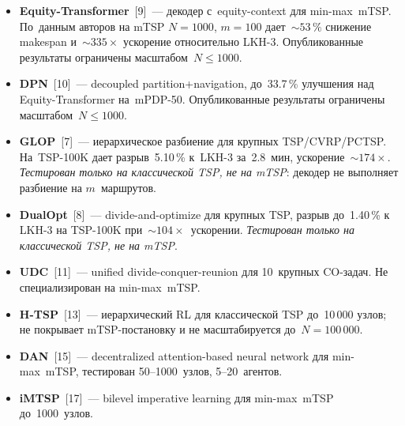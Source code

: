 \documentclass[a4paper,14pt]{extreport}
\begin{document}
\begin{itemize}
\item \textbf{Equity-Transformer}~[9]~--- декодер с~equity-context для min-max~mTSP. По~данным авторов на mTSP $N=1000$, $m=100$ дает~$\sim 53\,\%$ снижение makespan и~$\sim 335\times$ ускорение относительно LKH-3. Опубликованные результаты ограничены масштабом~$N \leq 1000$.
\item \textbf{DPN}~[10]~--- decoupled partition+navigation, до~33.7\,\% улучшения над Equity-Transformer на~mPDP-50. Опубликованные результаты ограничены масштабом~$N \leq 1000$.
\item \textbf{GLOP}~[7]~--- иерархическое разбиение для крупных TSP/CVRP/PCTSP. На~TSP-100K дает разрыв~5.10\,\% к~LKH-3 за~2.8~мин, ускорение~$\sim 174\times$. \emph{Тестирован только на классической TSP, не на mTSP}: декодер не выполняет разбиение на $m$~маршрутов.
\item \textbf{DualOpt}~[8]~--- divide-and-optimize для крупных TSP, разрыв до~1.40\,\% к LKH-3 на TSP-100K при~$\sim 104\times$~ускорении. \emph{Тестирован только на классической TSP, не на mTSP}.
\item \textbf{UDC}~[11]~--- unified divide-conquer-reunion для 10~крупных CO-задач. Не специализирован на min-max~mTSP.
\item \textbf{H-TSP}~[13]~--- иерархический RL для классической TSP до~10\,000 узлов; не покрывает mTSP-постановку и не масштабируется до~$N=100\,000$.
\item \textbf{DAN}~[15]~--- decentralized attention-based neural network для min-max~mTSP, тестирован 50--1000~узлов, 5--20~агентов.
\item \textbf{iMTSP}~[17]~--- bilevel imperative learning для min-max~mTSP до~1000~узлов.
\end{itemize}
\end{document}
